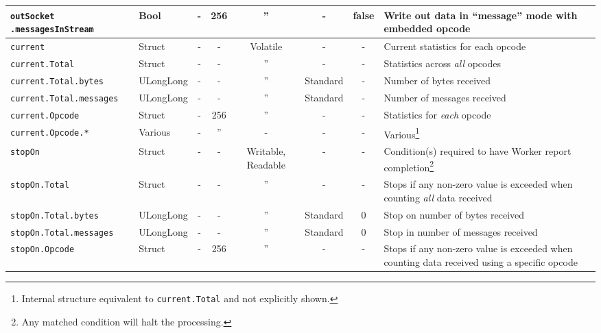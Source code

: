 \documentclass{article}
\begin{document}
\begin{landscape}
\begin{minipage}{\textwidth}
\begin{scriptsize}
\begin{tabular}{|p{3.2cm}|p{1.5cm}|c|c|c|c|c|p{7cm}|}
      \hline
      \verb+outSocket+ \verb+.messagesInStream+ &
      Bool &
      - &
      256 &
      '' &
      - &
      false &
      Write out data in ``message'' mode with embedded opcode \\
      \hline
      \verb+current+ &
      Struct &
      - &
      - &
      Volatile &
      - &
      - &
      Current statistics for each opcode \\
      \hline
      \verb+current.Total+ &
      Struct &
      - &
      - &
      '' &
      - &
      - &
      Statistics across \textit{all} opcodes \\
      \hline
      \verb+current.Total.bytes+ &
      ULongLong &
      - &
      - &
      '' &
      Standard &
      - &
      Number of bytes received \\
      \hline
      \verb+current.Total.messages+ &
      ULongLong &
      - &
      - &
      '' &
      Standard &
      - &
      Number of messages received \\
      \hline
      \verb+current.Opcode+ &
      Struct &
      - &
      256 &
      '' &
      - &
      - &
      Statistics for \textit{each} opcode \\
      \hline
      \verb+current.Opcode.*+ &
      Various &
      - &
      '' &
      - &
      - &
      - &
      Various\footnote{Internal structure equivalent to \texttt{current.Total} and not explicitly shown.} \\
      \hline
      \verb+stopOn+ &
      Struct &
      - &
      - &
      Writable, Readable\footnotemark[\thefnreadable] &
      - &
      - &
      Condition(s) required to have Worker report completion\footnote{Any matched condition will halt the processing.} \\
      \hline
      \verb+stopOn.Total+ &
      Struct &
      - &
      - &
      '' &
      - &
      - &
      Stops if any non-zero value is exceeded when counting \textit{all} data received \\
      \hline
      \verb+stopOn.Total.bytes+ &
      ULongLong &
      - &
      - &
      '' &
      Standard &
      0 &
      Stop on number of bytes received \\
      \hline
      \verb+stopOn.Total.messages+ &
      ULongLong &
      - &
      - &
      '' &
      Standard &
      0 &
      Stop in number of messages received \\
      \hline
      \verb+stopOn.Opcode+ &
      Struct &
      - &
      256 &
      '' &
      - &
      - &
      Stops if any non-zero value is exceeded when counting data received using a specific opcode \\

\end{tabular}
\end{scriptsize}
\end{minipage}
\end{landscape}
\end{document}
